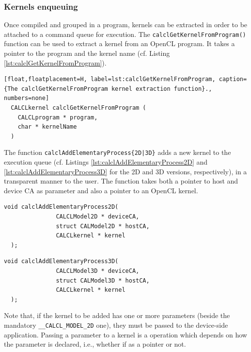 \subsubsection{Kernels enqueuing}

Once compiled and grouped in a program, kernels can be
extracted in order to be attached to a command queue for
execution. The \verb'calclGetKernelFromProgram()' function can be used
to extract a kernel from an OpenCL program. It takes a pointer to the
program and the kernel name (cf. Listing
\ref{lst:calclGetKernelFromProgram}).

\begin{lstlisting}[float,floatplacement=H, label=lst:calclGetKernelFromProgram, caption={The calclGetKernelFromProgram kernel extraction function}., numbers=none]
  CALCLkernel calclGetKernelFromProgram (
    CALCLprogram * program,
    char * kernelName
  )
\end{lstlisting}

The function \verb'calclAddElementaryProcess{2D|3D}' adds a new kernel
to the execution queue (cf. Listings
\ref{lst:calclAddElementaryProcess2D} and
\ref{lst:calclAddElementaryProcess3D} for the 2D and 3D versions,
respectively), in a transparent manner to the user. The function takes
both a pointer to host and device CA as parameter and also a pointer
to an OpenCL kernel.

\begin{lstlisting}[float,floatplacement=TH, label=lst:calclAddElementaryProcess2D, caption=The calclAddElementaryProcess2D() function., numbers=none]
  void calclAddElementaryProcess2D(
               CALCLModel2D * deviceCA,
               struct CALModel2D * hostCA,
               CALCLkernel * kernel
  );
\end{lstlisting}

\begin{lstlisting}[float,floatplacement=TH, label=lst:calclAddElementaryProcess3D, caption=The calclAddElementaryProcess3D() function., numbers=none]
  void calclAddElementaryProcess3D(
               CALCLModel3D * deviceCA,
               struct CALModel3D * hostCA,
               CALCLkernel * kernel
  );
\end{lstlisting}

Note that, if the kernel to be added has one or more parameters
(beside the mandatory \verb'__CALCL_MODEL_2D' one), they must be
passed to the device-side application. Passing a parameter to a
kernel is a operation which depends on how the parameter is declared, i.e., 
whether if as a pointer or not.


